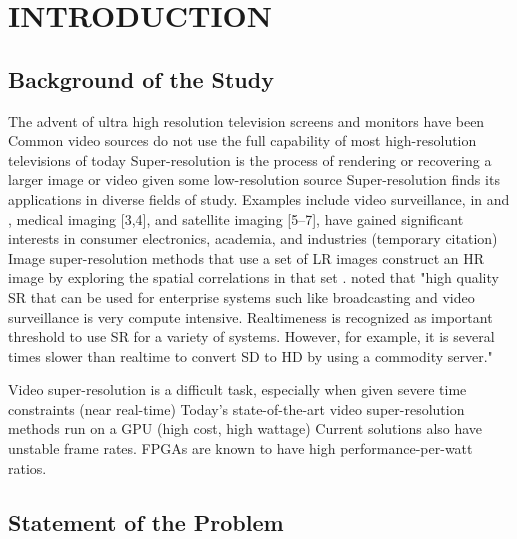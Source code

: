 
\chapter{INTRODUCTION} %

\label{Chapter1} %



\section{Background of the Study}
The advent of ultra high resolution television screens and monitors have been 
Common video sources do not use the full capability of most high-resolution televisions of today
Super-resolution is the process of rendering or recovering a larger image or video given some low-resolution source \citep{Dong2014}
Super-resolution finds its applications in diverse fields of study. Examples include video surveillance, in \cite{Caner2003} and \cite{Zhang2010},  medical imaging [3,4], and satellite imaging [5–7], have gained significant interests in consumer electronics, academia, and industries (temporary citation)  \citep{Cheng2013}
Image super-resolution methods that use a set of LR images construct an HR image by exploring the spatial correlations in that set \citep{Cheng2013}.
\cite{Ishizaka2013} noted that "high quality SR that can be used for enterprise systems such like broadcasting and video surveillance is very compute intensive. Realtimeness is recognized as important threshold to use SR for a variety of systems. However, for example, it is several times slower than realtime to convert SD to HD by using a commodity server."

Video super-resolution is a difficult task, especially when given severe time constraints (near real-time)
Today's state-of-the-art video super-resolution methods run on a GPU (high cost, high wattage)
Current solutions also have unstable frame rates.
FPGAs are known to have high performance-per-watt ratios.


\section{Statement of the Problem}

